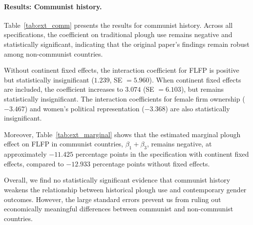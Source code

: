 \documentclass[12pt,a4paper]{article}
\begin{document}
\paragraph{Results: Communist history.}
Table~\ref{tab:ext_comm} presents the results for communist history. Across all specifications, the coefficient on traditional plough use remains negative and statistically
significant, indicating that the original paper's findings remain robust among non-communist countries.

Without continent fixed effects, the interaction coefficient for FLFP is positive but statistically insignificant ($1.239$, SE $=5.960$). When continent fixed effects are
included, the coefficient increases to $3.074$ (SE $=6.103$), but remains statistically insignificant. The interaction coefficients for female firm ownership ($-3.467$) and women's political representation ($-3.368$) are also statistically insignificant.

Moreover, Table~\ref{tab:ext_marginal} shows that the estimated marginal plough effect on FLFP in communist countries, $\beta_1+\beta_3$, remains negative, at approximately $-11.425$ percentage points in the specification with continent fixed effects, compared to $-12.933$ percentage points without fixed effects.

Overall, we find no statistically significant evidence that communist history weakens the relationship between historical plough use and contemporary gender outcomes. However, the large standard errors prevent us from ruling out economically meaningful differences between communist and non-communist countries.
\end{document}
